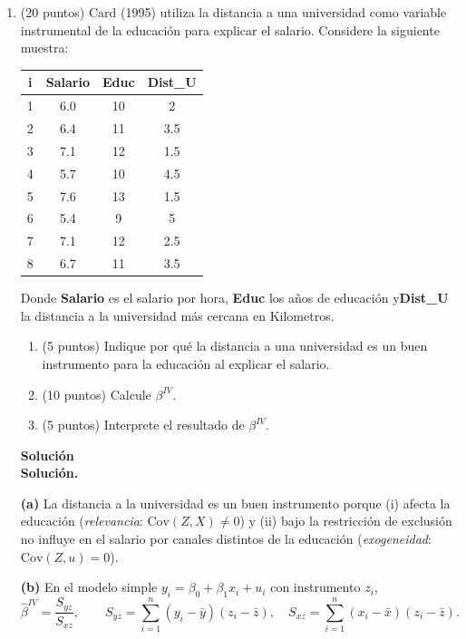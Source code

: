 \documentclass[10pt,a4paper]{article}
\begin{document}
\begin{enumerate}
    

\item (20 puntos) Card (1995) utiliza la distancia a una universidad como variable instrumental de la educación para explicar el salario. Considere la siguiente muestra:
\begin{center}
\begin{tabular}{|c|c|c|c|}
\hline
i & Salario & Educ & Dist_U \\
\hline
1 & 6.0 & 10 & 2 \\
2 & 6.4 & 11 & 3.5 \\
3 & 7.1 & 12 & 1.5 \\
4 & 5.7 & 10 & 4.5 \\
5 & 7.6 & 13 & 1.5 \\
6 & 5.4 &  9 & 5 \\
7 & 7.1 & 12 & 2.5 \\
8 & 6.7 & 11 & 3.5 \\
\hline
\end{tabular}
\end{center}
Donde \textbf{Salario} es el salario por hora, \textbf{Educ} los años de educación y\textbf{Dist_U} la distancia a la universidad más cercana en Kilometros.

\begin{enumerate}
    \item (5 puntos) Indique por qué la distancia a una universidad es un buen instrumento para la educación al explicar el salario.
    \item (10 puntos) Calcule \(\beta^{IV}\).
    \item (5 puntos) Interprete el resultado de \(\beta^{IV}\).
\end{enumerate}

\textbf{Solución}
\\

\textbf{Solución.}

\textbf{(a)} La distancia a la universidad es un buen instrumento porque (i) afecta la educación (\emph{relevancia}: \(\mathrm{Cov}(Z,X)\neq 0\)) y (ii) bajo la restricción de exclusión no influye en el salario por canales distintos de la educación (\emph{exogeneidad}: \(\mathrm{Cov}(Z,u)=0\)).

\medskip
\textbf{(b)} En el modelo simple \(y_i=\beta_0+\beta_1 x_i+u_i\) con instrumento \(z_i\),
\[
\hat\beta^{IV}=\frac{S_{yz}}{S_{xz}},\qquad
S_{yz}=\sum_{i=1}^n (y_i-\bar y)(z_i-\bar z),\quad
S_{xz}=\sum_{i=1}^n (x_i-\bar x)(z_i-\bar z).
\]


\end{enumerate}
\end{document}
